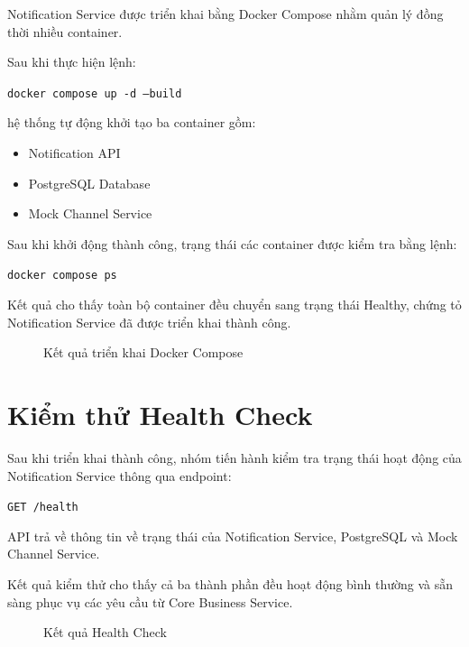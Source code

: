 Notification Service được triển khai bằng Docker Compose nhằm quản lý đồng thời nhiều container.

Sau khi thực hiện lệnh:

\begin{center}
\texttt{docker compose up -d --build}
\end{center}

hệ thống tự động khởi tạo ba container gồm:

\begin{itemize}
\item Notification API
\item PostgreSQL Database
\item Mock Channel Service
\end{itemize}

Sau khi khởi động thành công, trạng thái các container được kiểm tra bằng lệnh:

\begin{center}
\texttt{docker compose ps}
\end{center}

Kết quả cho thấy toàn bộ container đều chuyển sang trạng thái Healthy, chứng tỏ Notification Service đã được triển khai thành công.

\begin{figure}[H]
\centering
{}
\caption{Kết quả triển khai Docker Compose}
\label{fig:docker-ps}
\end{figure}

\section{Kiểm thử Health Check}

Sau khi triển khai thành công, nhóm tiến hành kiểm tra trạng thái hoạt động của Notification Service thông qua endpoint:

\begin{center}
\texttt{GET /health}
\end{center}

API trả về thông tin về trạng thái của Notification Service, PostgreSQL và Mock Channel Service.

Kết quả kiểm thử cho thấy cả ba thành phần đều hoạt động bình thường và sẵn sàng phục vụ các yêu cầu từ Core Business Service.

\begin{figure}[H]
\centering
{}
\caption{Kết quả Health Check}
\label{fig:health}
\end{figure}

